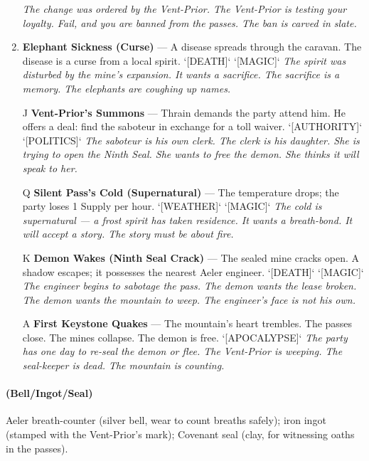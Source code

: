 \begin{enumerate}
  \hfill \textit{The change was ordered by the Vent-Prior. The Vent-Prior is testing your loyalty. Fail, and you are banned from the passes. The ban is carved in slate.}
\item \textbf{Elephant Sickness (Curse)} --- A disease spreads through the caravan. The disease is a curse from a local spirit. `[DEATH]` `[MAGIC]`
  \hfill \textit{The spirit was disturbed by the mine's expansion. It wants a sacrifice. The sacrifice is a memory. The elephants are coughing up names.}
\item[J] \textbf{Vent-Prior's Summons} --- Thrain demands the party attend him. He offers a deal: find the saboteur in exchange for a toll waiver. `[AUTHORITY]` `[POLITICS]`
  \hfill \textit{The saboteur is his own clerk. The clerk is his daughter. She is trying to open the Ninth Seal. She wants to free the demon. She thinks it will speak to her.}
\item[Q] \textbf{Silent Pass's Cold (Supernatural)} --- The temperature drops; the party loses 1 Supply per hour. `[WEATHER]` `[MAGIC]`
  \hfill \textit{The cold is supernatural — a frost spirit has taken residence. It wants a breath-bond. It will accept a story. The story must be about fire.}
\item[K] \textbf{Demon Wakes (Ninth Seal Crack)} --- The sealed mine cracks open. A shadow escapes; it possesses the nearest Aeler engineer. `[DEATH]` `[MAGIC]`
  \hfill \textit{The engineer begins to sabotage the pass. The demon wants the lease broken. The demon wants the mountain to weep. The engineer's face is not his own.}
\item[A] \textbf{First Keystone Quakes} --- The mountain's heart trembles. The passes close. The mines collapse. The demon is free. `[APOCALYPSE]`
  \hfill \textit{The party has one day to re-seal the demon or flee. The Vent-Prior is weeping. The seal-keeper is dead. The mountain is counting.}
\end{enumerate}

\paragraph*{(Bell/Ingot/Seal)} Aeler breath-counter (silver bell, wear to count breaths safely); iron ingot (stamped with the Vent-Prior's mark); Covenant seal (clay, for witnessing oaths in the passes).

